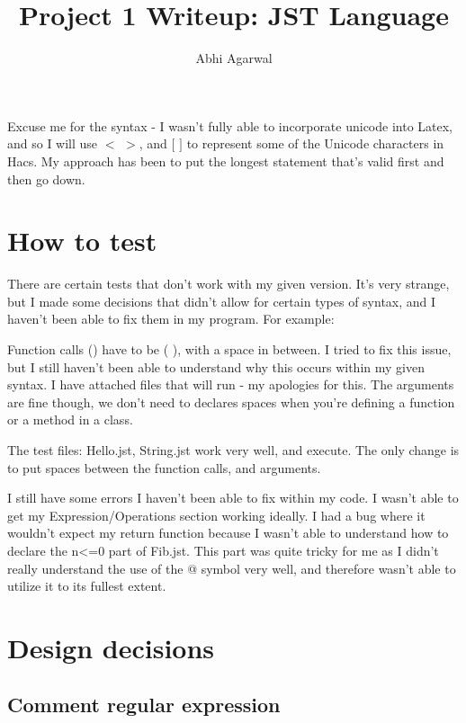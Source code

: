 \documentclass[11pt, oneside]{article}
\title{Project 1 Writeup: JST Language}
\author{Abhi Agarwal}
\date{}
\begin{document}
\maketitle

\par Excuse me for the syntax - I wasn't fully able to incorporate unicode into Latex, and so I will use $<$ $>$, and $[$ $]$ to represent some of the Unicode characters in Hacs. My approach has been to put the longest statement that's valid first and then go down.

\section{How to test}

\par \indent There are certain tests that don't work with my given version. It's very strange, but I made some decisions that didn't allow for certain types of syntax, and I haven't been able to fix them in my program. For example:

\par Function calls () have to be ( ), with a space in between. I tried to fix this issue, but I still haven't been able to understand why this occurs within my given syntax. I have attached files that will run - my apologies for this. The arguments are fine though, we don't need to declares spaces when you're defining a function or a method in a class.

\par The test files: Hello.jst, String.jst work very well, and execute. The only change is to put spaces between the function calls, and arguments.

\par I still have some errors I haven't been able to fix within my code. I wasn't able to get my Expression/Operations section working ideally. I had a bug where it wouldn't expect my return function because I wasn't able to understand how to declare the n<=0 part of Fib.jst. This part was quite tricky for me as I didn't really understand the use of the @ symbol very well, and therefore wasn't able to utilize it to its fullest extent. 

\section{Design decisions}

\subsection{Comment regular expression}
\end{document}
